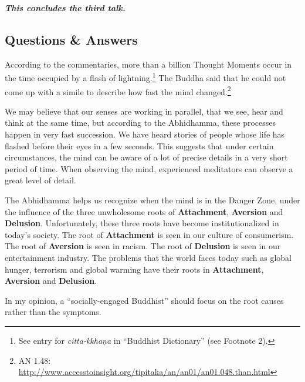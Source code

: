 \begin{center}
\textbf{\textit{This concludes the third talk.}} \\
\end{center}

\newpage

\subsection*{Questions \& Answers}
\color {red}


According to the commentaries, more than a billion Thought Moments occur in the time occupied by a flash of lightning.\footnote{See entry for \textit{citta-kkhaṇa} in “Buddhist Dictionary” (see Footnote 2).} The Buddha said that he could not come up with a simile to describe how fast the mind changed.\footnote{AN 1.48: \url{http://www.accesstoinsight.org/tipitaka/an/an01/an01.048.than.html}}

We may believe that our senses are working in parallel, that we see, hear and think at the same time, but according to the Abhidhamma, these processes happen in very fast succession. We have heard stories of people whose life has flashed before their eyes in a few seconds. This suggests that under certain circumstances, the mind can be aware of a lot of precise details in a very short period of time. When observing the mind, experienced meditators can observe a great level of detail.


The Abhidhamma helps us recognize when the mind is in the Danger Zone, under the influence of the three unwholesome roots of \textbf{Attachment}, \textbf{Aversion} and \textbf{Delusion}. Unfortunately, these three roots have become institutionalized in today's society. The root of \textbf{Attachment} is seen in our culture of consumerism. The root of \textbf{Aversion} is seen in racism. The root of \textbf{Delusion} is seen in our entertainment industry. The problems that the world faces today such as global hunger, terrorism and global warming have their roots in \textbf{Attachment}, \textbf{Aversion} and \textbf{Delusion}.

In my opinion, a “socially-engaged Buddhist” should focus on the root causes rather than the symptoms. 

\color {black}


